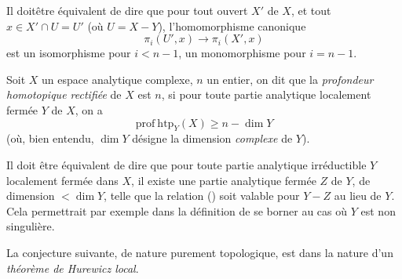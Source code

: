 Il doit\pageoriginale \^etre \'equivalent de dire que pour tout ouvert $X'$ de $X$, et tout $x\in X'\cap U=U'$ (o\`u $U=X-Y$), l'homomorphisme canonique
$$
\pi_i(U', x)\to\pi_i(X', x)$$
est un isomorphisme pour $i<n-1$, un monomorphisme pour $i=n-1$.

\begin{supdefinition} \label{XIII.6.2}
Soit $X$ un espace analytique complexe, $n$ un entier, on dit que la \emph{profondeur homotopique rectifi\'ee} de $X$ est $n$, si pour toute partie analytique localement ferm\'ee $Y$ de $X$, on a
\begin{equation*} \label{eq:XIII.6.x} \tag{$x$} {\mathrm{prof\:htp}_Y(X)\geq n-\dim Y}
\end{equation*}
(o\`u, bien entendu, $\dim Y$ d\'esigne la dimension \emph{complexe} de $Y$).
\end{supdefinition}

Il doit \^etre \'equivalent de dire que pour toute partie analytique irr\'eductible $Y$ localement ferm\'ee dans $X$, il existe une partie analytique ferm\'ee $Z$ de $Y$, de dimension $<\dim Y$, telle que la relation () soit valable pour $Y-Z$ au lieu de $Y$. Cela permettrait par exemple dans la d\'efinition  de se borner au cas o\`u $Y$ est non singuli\`ere.

\enlargethispage{\baselineskip}%
La conjecture suivante, de nature purement topologique, est dans la nature d'un \og \emph{th\'eor\`eme de Hurewicz local}\fg.

